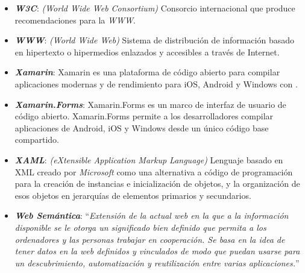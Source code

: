 \begin{itemize}
    \item \textbf{\textit{W3C}}: \emph{(World Wide Web Consortium)} Consorcio 
    internacional que produce recomendaciones para la \emph{WWW}.

    \item \textbf{\textit{WWW}}: \emph{(World Wide Web)} Sistema de distribución 
    de información basado en hipertexto o hipermedios enlazados y accesibles 
    a través de Internet. 

    \item \textbf{\textit{Xamarin}}: Xamarin es una plataforma de código 
    abierto para compilar aplicaciones modernas y de rendimiento para iOS, 
    Android y Windows con \net.

    \item \textbf{\textit{Xamarin.Forms}}: Xamarin.Forms es un marco de 
    interfaz de usuario de código abierto. Xamarin.Forms permite a los 
    desarrolladores compilar aplicaciones de Android, iOS y Windows 
    desde un único código base compartido.

    \item \textbf{\textit{XAML}}: \emph{(eXtensible Application Markup 
    Language)} Lenguaje basado en XML creado por \emph{Microsoft} como una 
    alternativa a código de programación para la creación de instancias 
    e inicialización de objetos, y la organización de esos objetos en 
    jerarquías de elementos primarios y secundarios.

    \item \textbf{\textit{Web Semántica}}: ``\textit{Extensión de la actual 
    web en la que a la información disponible se le otorga un significado 
    bien definido que permita a los ordenadores y las personas trabajar en 
    cooperación. Se basa en la idea de tener datos en la web definidos y 
    vinculados de modo que puedan usarse para un descubrimiento, 
    automatización y reutilización entre varias aplicaciones.}''


\end{itemize}

